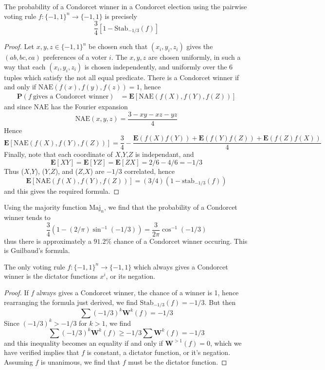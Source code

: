 \begin{lemma}
    The probability of a Condorcet winner in a Condorcet election using the pairwise voting rule $f: \{ -1, 1 \}^n \to \{ -1, 1 \}$ is precisely
    \[ \frac{3}{4} [1 - \text{Stab}_{-1/3}(f)] \]
\end{lemma}
\begin{proof}
    Let $x,y,z \in \{ -1, 1 \}^n$ be chosen such that $(x_i,y_i,z_i)$ gives the $(ab,bc,ca)$ preferences of a voter $i$. The $x,y,z$ are chosen uniformly, in such a way that each $(x_i,y_i,z_i)$ is chosen independently, and uniformly over the 6 tuples which satisfy the not all equal predicate. There is a Condorcet winner if and only if $\text{NAE}(f(x),f(y),f(z)) = 1$, hence
    \begin{align*}
        \mathbf{P}(f\ \text{gives a Condorcet winner}) &= \mathbf{E}[\text{NAE}(f(X),f(Y),f(Z))]
    \end{align*}
    and since $\text{NAE}$ has the Fourier expansion
    \[ \text{NAE}(x,y,z) = \frac{3 - xy - xz - yz}{4} \]
    Hence
    \[ \mathbf{E}[\text{NAE}(f(X),f(Y),f(Z))] = \frac{3}{4} - \frac{\mathbf{E}(f(X)f(Y)) + \mathbf{E}(f(Y)f(Z)) + \mathbf{E}(f(Z)f(X))}{4} \]
    Finally, note that each coordinate of $X$,$Y$,$Z$ is independant, and
    \[ \mathbf{E}[XY] = \mathbf{E}[YZ] = \mathbf{E}[ZX] = 2/6 - 4/6 = -1/3 \]
    Thus ($X$,$Y$), ($Y$,$Z$), and ($Z$,$X$) are $-1/3$ correlated, hence
    \[ \mathbf{E}[\text{NAE}(f(X),f(Y),f(Z))] = (3/4)(1 - \text{stab}_{-1/3}(f)) \]
    and this gives the required formula.
\end{proof}

\begin{example}
    Using the majority function $\text{Maj}_n$, we find that the probability of a Condorcet winner tends to
    \[ \frac{3}{4}(1 - (2/\pi) \sin^{-1}(-1/3)) = \frac{3}{2\pi} \cos^{-1}(-1/3) \]
    thus there is approximately a $91.2\%$ chance of a Condorcet winner occuring. This is Guilbaud's formula.
\end{example}

\begin{theorem}[Kalai]
    The only voting rule $f: \{ -1, 1 \}^n \to \{ -1, 1 \}$ which always gives a Condorcet winner is the dictator functions $x^i$, or its negation.
\end{theorem}
\begin{proof}
    If $f$ always gives a Condorcet winner, the chance of a winner is 1, hence rearranging the formula just derived, we find $\text{Stab}_{-1/3}(f) = -1/3$. But then
    \[ \sum (-1/3)^k \mathbf{W}^k(f) = -1/3 \]
    Since $(-1/3)^k > -1/3$ for $k > 1$, we find
    \[ \sum (-1/3)^k \mathbf{W}^k(f) \geq -1/3 \sum \mathbf{W}^k(f) = -1/3 \]
    and this inequality becomes an equality if and only if $\mathbf{W}^{> 1}(f) = 0$, which we have verified implies that $f$ is constant, a dictator function, or it's negation. Assuming $f$ is unanimous, we find that $f$ must be the dictator function.
\end{proof}

